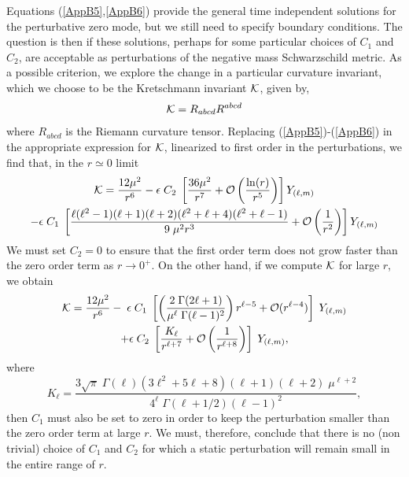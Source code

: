 \documentclass[12pt,aps,floats,showpacs,amssymb,tightenlines]{revtex4}
\newcommand{\m}{\mu}
\begin{document}
Equations (\ref{AppB5},\ref{AppB6}) provide the general time
independent solutions for the perturbative zero mode, but we still need to specify boundary conditions.
The question is
then if these solutions, perhaps for some particular choices of
$C_1$ and $C_2$, are acceptable as perturbations of the negative mass
Schwarzschild metric. As a possible criterion, we explore the change
in a particular curvature invariant, which we choose
 to be the Kretschmann invariant ${\cal{K}}$, given by,
\begin{equation}
\label{RW9} {\cal{K}} = R_{abcd} R^{abcd}
\end{equation}
where $R_{abcd}$ is the Riemann curvature tensor. Replacing
(\ref{AppB5})-(\ref{AppB6}) in the appropriate expression for
${\cal{K}}$, linearized to
 first order in the perturbations, we find that, in the $r \simeq 0$
 limit
\begin{multline}
\label{Kcerca} {\cal{K}} = \frac{12 \m^2}{r^6} - \epsilon \; C_2 \;
\left[  \frac{36 \m^2}{r^7}  + {\cal O} \left( \frac{\ln(r) }{r^5}
\right) \right] Y_{(\ell,m)}
\\ - \epsilon \; C_1 \;\left[ \frac{\ell (\ell ^2-1) (\ell +1)
(\ell+2)(\ell ^2+\ell +4)(\ell ^2+\ell-1)}{ 9 \; \m^2 r^3} + {\cal
O} \left( \frac{1}{r^2} \right)\right] Y_{(\ell,m)}
\end{multline}
 We must set $C_2=0$ to ensure that the first order term
does not grow faster than the zero order term as $r \to 0^{+}$. On
the other hand, if we  compute ${\cal{K}}$ for large $r$,  we obtain
\begin{multline}
\label{Klejos} {\cal{K}} = \frac {12 \mu^2} {{r}^{6}} -  \; \epsilon
\; C_1 \; \left[ \left( \frac{2 \; \Gamma (2 \ell +1)}{\mu^{\ell} \;
\Gamma (\ell-1)^2} \right) r^{\ell-5} +  {\cal O} (r^{\ell-4})
\right] \; Y_{(\ell,m)} \\
+ \epsilon \; C_2 \; \left[ \frac{K_{\ell}}{ r^{\ell+7}} +  {\cal O}
\left( \frac{1}{r^{\ell+8}} \right) \right] \; Y_{(\ell,m)},
\end{multline}
where
\begin{equation}
K_{\ell} = \frac{3 \sqrt{\pi} \; \Gamma(\ell)  (3 \ell^2+5 \ell
+8)(\ell+1)(\ell+2) \;\m^{\ell +2}}{ 4^{\ell} \; \Gamma(\ell +1/2)
(\ell-1)^2},
\end{equation}
then $C_1$ must also be set to zero in order to keep the
perturbation smaller than the zero order term  at large $r$.
 We must, therefore, conclude that there is
no (non trivial) choice of $C_1$ and $C_2$ for which a static
 perturbation will remain small in the entire range of $r$.\\
\end{document}
